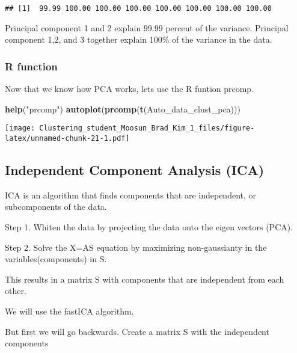 \documentclass[11pt,]{article}
\newenvironment{Shaded}{\begin{snugshade}}{\end{snugshade}}
\newcommand{\KeywordTok}[1]{\textcolor[rgb]{0.13,0.29,0.53}{\textbf{#1}}}
\newcommand{\NormalTok}[1]{#1}
\newcommand{\StringTok}[1]{\textcolor[rgb]{0.31,0.60,0.02}{#1}}
\begin{document}
\begin{verbatim}
## [1]  99.99 100.00 100.00 100.00 100.00 100.00 100.00 100.00
\end{verbatim}

Principal component 1 and 2 explain 99.99 percent of the variance.
Principal component 1,2, and 3 together explain 100\% of the variance in
the data.

\hypertarget{r-function-2}{%
\subsubsection{R function}\label{r-function-2}}

Now that we know how PCA works, lets use the R funtion prcomp.

\begin{Shaded}
\begin{Highlighting}[]
\KeywordTok{help}\NormalTok{(}\StringTok{"prcomp"}\NormalTok{)}
\KeywordTok{autoplot}\NormalTok{(}\KeywordTok{prcomp}\NormalTok{(}\KeywordTok{t}\NormalTok{(Auto_data_clust_pca)))}
\end{Highlighting}
\end{Shaded}

\texttt{[image: Clustering\_student\_Moosun\_Brad\_Kim\_1\_files/figure-latex/unnamed-chunk-21-1.pdf]}

\newpage

\hypertarget{independent-component-analysis-ica}{%
\subsection{Independent Component Analysis
(ICA)}\label{independent-component-analysis-ica}}

ICA is an algorithm that finds components that are independent, or
subcomponents of the data.

Step 1. Whiten the data by projecting the data onto the eigen vectors
(PCA).

Step 2. Solve the X=AS equation by maximizing non-gaussianty in the
variables(components) in S.

This results in a matrix S with components that are independent from
each other.

We will use the fastICA algorithm.

But first we will go backwards. Create a matrix S with the independent
components
\end{document}
